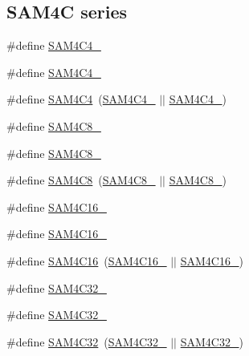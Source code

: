 \subsection*{S\+A\+M4C series}
\begin{DoxyCompactItemize}
\item 
\#define \mbox{\hyperlink{group__sam__part__macros__group_ga77c44ef9d719d70486f81402ebee7b27}{S\+A\+M4\+C4\+\_}}
\item 
\#define \mbox{\hyperlink{group__sam__part__macros__group_ga0ca9d376eb3cac4e27fb9bd79ec028a6}{S\+A\+M4\+C4\+\_}}
\item 
\#define \mbox{\hyperlink{group__sam__part__macros__group_ga63e801e944f8a131c2f940addf134ac7}{S\+A\+M4\+C4}}~(\mbox{\hyperlink{group__sam__part__macros__group_ga77c44ef9d719d70486f81402ebee7b27}{S\+A\+M4\+C4\+\_}} $\vert$$\vert$ \mbox{\hyperlink{group__sam__part__macros__group_ga0ca9d376eb3cac4e27fb9bd79ec028a6}{S\+A\+M4\+C4\+\_}})
\item 
\#define \mbox{\hyperlink{group__sam__part__macros__group_ga6210432e77e4bc0e170dc71370a3e845}{S\+A\+M4\+C8\+\_}}
\item 
\#define \mbox{\hyperlink{group__sam__part__macros__group_ga349700d2ac7573d426776e85f7632361}{S\+A\+M4\+C8\+\_}}
\item 
\#define \mbox{\hyperlink{group__sam__part__macros__group_ga8a05a38838ed43d62f89266155741aeb}{S\+A\+M4\+C8}}~(\mbox{\hyperlink{group__sam__part__macros__group_ga6210432e77e4bc0e170dc71370a3e845}{S\+A\+M4\+C8\+\_}} $\vert$$\vert$ \mbox{\hyperlink{group__sam__part__macros__group_ga349700d2ac7573d426776e85f7632361}{S\+A\+M4\+C8\+\_}})
\item 
\#define \mbox{\hyperlink{group__sam__part__macros__group_ga933b4554835e5159623415812db1400e}{S\+A\+M4\+C16\+\_}}
\item 
\#define \mbox{\hyperlink{group__sam__part__macros__group_ga9240bd8927b6ae5e76e4f60cbe18be4b}{S\+A\+M4\+C16\+\_}}
\item 
\#define \mbox{\hyperlink{group__sam__part__macros__group_ga74d1bd22ed59bc6a2c34d9d723332931}{S\+A\+M4\+C16}}~(\mbox{\hyperlink{group__sam__part__macros__group_ga933b4554835e5159623415812db1400e}{S\+A\+M4\+C16\+\_}} $\vert$$\vert$ \mbox{\hyperlink{group__sam__part__macros__group_ga9240bd8927b6ae5e76e4f60cbe18be4b}{S\+A\+M4\+C16\+\_}})
\item 
\#define \mbox{\hyperlink{group__sam__part__macros__group_ga80a3a5850f6f7ac1b16a781c63e46c67}{S\+A\+M4\+C32\+\_}}
\item 
\#define \mbox{\hyperlink{group__sam__part__macros__group_ga84c94a3f93f7d2a0c440607a263477b7}{S\+A\+M4\+C32\+\_}}
\item 
\#define \mbox{\hyperlink{group__sam__part__macros__group_ga4db5c63ded057f50bd4359538bc1299f}{S\+A\+M4\+C32}}~(\mbox{\hyperlink{group__sam__part__macros__group_ga80a3a5850f6f7ac1b16a781c63e46c67}{S\+A\+M4\+C32\+\_}} $\vert$$\vert$ \mbox{\hyperlink{group__sam__part__macros__group_ga84c94a3f93f7d2a0c440607a263477b7}{S\+A\+M4\+C32\+\_}})
\end{DoxyCompactItemize}
